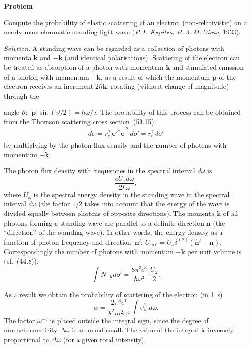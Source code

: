 \textbf{Problem}

Compute the probability of elastic scattering of an electron (non-relativistic) on a nearly monochromatic standing light wave (\textit{P.\,L.\,Kapitza, P.\,A.\,M.\,Dirac}, 1933).

\textit{Solution.} A standing wave can be regarded as a collection of photons with momenta $\mathbf{k}$ and $-\mathbf{k}$ (and identical polarisations). Scattering of the electron can be treated as absorption of a photon with momentum $\mathbf{k}$ and stimulated emission of a photon with momentum $-\mathbf{k}$, as a result of which the momentum $\mathbf{p}$ of the electron receives an increment $2\hbar\mathbf{k}$, rotating (without change of magnitude) through the

angle $\vartheta$: $|\mathbf{p}|\sin(\vartheta/2) = \hbar\omega/c$. The probability of this process can be obtained from the Thomson scattering cross section~(59.15):
\[
d\sigma = r^2_e|\mathbf{e}'^*\mathbf{e}|^2\,do' = r^2_e\,do'
\]
by multiplying by the photon flux density and the number of photons with momentum $-\mathbf{k}$.

The photon flux density with frequencies in the spectral interval $d\omega$ is
\[
\frac{cU_\omega d\omega}{2\hbar\omega},
\]
where $U_\omega$ is the spectral energy density in the standing wave in the spectral interval $d\omega$ (the factor $1/2$ takes into account that the energy of the wave is divided equally between photons of opposite directions). The momenta $\mathbf{k}$ of all photons forming a standing wave are parallel to a definite direction $\mathbf{n}$ (the ``direction'' of the standing wave). In other words, the energy density as a function of photon frequency and direction~$\mathbf{n}'$: $U_{\omega\mathbf{n}'} = U_\omega\delta^{(2)}(\hat{\mathbf{n}}' - \mathbf{n})$. Correspondingly the number of photons with momentum $-\mathbf{k}$ per unit volume is (cf.~(44.8)):
\[
\int N_{-\mathbf{k}}do' = \frac{8\pi^3c^3}{\hbar\omega^3}\;\frac{U_\omega}{2}.
\]

As a result we obtain the probability of scattering of the electron (in 1~s)
\[
w = \frac{2\pi^3e^4}{\hbar^2m^2\omega^4}\int U^2_\omega\,d\omega.
\]
The factor $\omega^{-4}$ is placed outside the integral sign, since the degree of monochromaticity $\Delta\omega$ is assumed small. The value of the integral is inversely proportional to $\Delta\omega$ (for a given total intensity).
